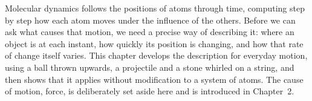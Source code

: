 Molecular dynamics follows the positions of atoms through time, computing
step by step how each atom moves under the influence of the others. Before
we can ask what causes that motion, we need a precise way of describing
it: where an object is at each instant, how quickly its position is
changing, and how that rate of change itself varies. This chapter develops
the description for everyday motion, using a ball thrown upwards, a
projectile and a stone whirled on a string, and then shows that it applies
without modification to a system of atoms. The cause of motion, force, is
deliberately set aside here and is introduced in Chapter~2.
